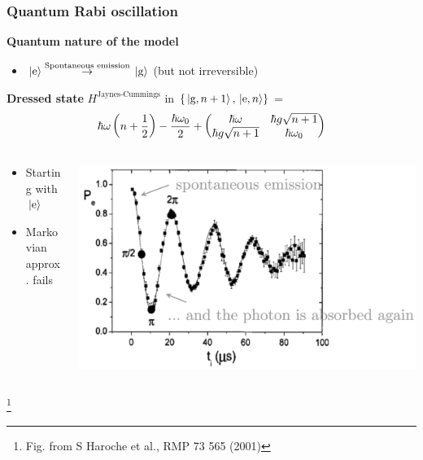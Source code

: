 \documentclass[t]{beamer}
\newcommand\blfootnote[1]{%
\begingroup
\renewcommand\thefootnote{}\footnote{#1}%
\addtocounter{footnote}{-1}%
\endgroup
}
\begin{document}
\begin{frame}[t]
\frametitle{Quantum Rabi oscillation}

\textbf{Quantum nature of the model} \begin{itemize}
    \item $\ket*{\text{e}} \stackrel{\text{Spontaneous emission}}{\to}   \ket*{\text{g}}$ (but not irreversible)
\end{itemize}

\textbf{Dressed state} $H^{\text{Jaynes-Cummings}}$ in $\{ \ket*{\text{g}, n+1}, \ket*{\text{e}, n} \}$ = 
\[
    \hbar \omega \left( n + \frac{1}{2} \right) - \frac{\hbar \omega_0}{2} + 
    \pmqty{
        \hbar \omega  & \hbar g \sqrt{n+1} \\
        \hbar g \sqrt{n+1} & \hbar \omega_0
    }
\]

\begin{columns}[T]
    \begin{column}{0.5\textwidth}
        \begin{itemize}
            \item Starting with $\ket*{\text{e}}$
            \item Markovian approx. fails
        \end{itemize}
    \end{column}
    \begin{column}{0.5\textwidth}
        \includegraphics[width=\textwidth]{figs/quantum-rabi-annotated.png}
    \end{column}
\end{columns}

\blfootnote{Fig. from S Haroche et al., RMP 73 565 (2001)}

\end{frame}
\end{document}
